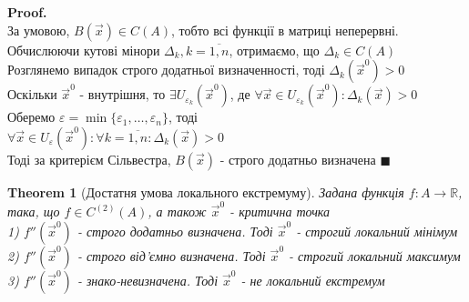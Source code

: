 \documentclass[a4paper, 14pt]{extarticle}
\theoremstyle{theoremdd}
\newtheorem{theorem}{Theorem}[subsection]
\theoremstyle{theoremdd}
\theoremstyle{theoremdd}
\theoremstyle{theoremdd}
\theoremstyle{theoremdd}
\theoremstyle{theoremdd}
\theoremstyle{theoremdd}
\theoremstyle{theoremdd}
\newenvironment{pf}{\vspace*{-3mm} \textbf{Proof. \\}}{$\blacksquare$}
\begin{document}
\begin{pf}
За умовою, $B(\vec{x}) \in C(A)$, тобто всі функції в матриці неперервні. Обчислюючи кутові мінори $\Delta_k, k = \overline{1,n}$, отримаємо, що $\Delta_k \in C(A)$\\
Розглянемо випадок строго додатньої визначенності, тоді $\Delta_k (\vec{x}^0) > 0$\\
Оскільки $\vec{x}^0$ - внутрішня, то $\exists U_{\varepsilon_k}(\vec{x}^0)$, де $\forall \vec{x} \in U_{\varepsilon_k}(\vec{x}^0): \Delta_k(\vec{x}) > 0$\\
Оберемо $\varepsilon = \min \{\varepsilon_1, \dots, \varepsilon_n \}$, тоді\\
$\forall \vec{x} \in U_{\varepsilon}(\vec{x}^0): \forall k = \overline{1,n}: \Delta_k(\vec{x}) > 0$\\
Тоді за критерієм Сільвестра, $B(\vec{x})$ - строго додатньо визначена
\end{pf}

\begin{theorem}[Достатня умова локального екстремуму]
Задана функція $f: A \to \mathbb{R}$, така, що $f \in C^{(2)}(A)$, а також $\vec{x}^0$ - критична точка\\
1) $f''(\vec{x}^0)$ - строго додатньо визначена. Тоді $\vec{x}^0$ - строгий локальний мінімум\\
2) $f''(\vec{x}^0)$ - строго від'ємно визначена. Тоді $\vec{x}^0$ - строгий локальний максимум\\
3) $f''(\vec{x}^0)$ - знако-невизначена. Тоді $\vec{x}^0$ - не локальний екстремум
\end{theorem}
\end{document}
